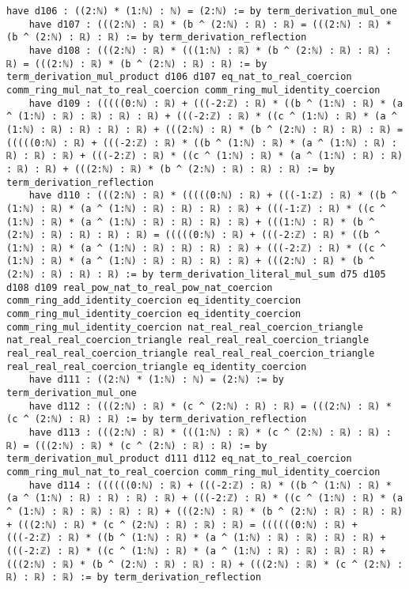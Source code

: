 \documentclass{article}
\begin{document}
\begin{tcolorbox}[colback=white!10, width=\linewidth]
\begin{lstlisting}[language=Lean4]
    have d106 : ((2:ℕ) * (1:ℕ) : ℕ) = (2:ℕ) := by term_derivation_mul_one
    have d107 : (((2:ℕ) : ℝ) * (b ^ (2:ℕ) : ℝ) : ℝ) = (((2:ℕ) : ℝ) * (b ^ (2:ℕ) : ℝ) : ℝ) := by term_derivation_reflection
    have d108 : (((2:ℕ) : ℝ) * (((1:ℕ) : ℝ) * (b ^ (2:ℕ) : ℝ) : ℝ) : ℝ) = (((2:ℕ) : ℝ) * (b ^ (2:ℕ) : ℝ) : ℝ) := by term_derivation_mul_product d106 d107 eq_nat_to_real_coercion comm_ring_mul_nat_to_real_coercion comm_ring_mul_identity_coercion
    have d109 : (((((0:ℕ) : ℝ) + (((-2:ℤ) : ℝ) * ((b ^ (1:ℕ) : ℝ) * (a ^ (1:ℕ) : ℝ) : ℝ) : ℝ) : ℝ) + (((-2:ℤ) : ℝ) * ((c ^ (1:ℕ) : ℝ) * (a ^ (1:ℕ) : ℝ) : ℝ) : ℝ) : ℝ) + (((2:ℕ) : ℝ) * (b ^ (2:ℕ) : ℝ) : ℝ) : ℝ) = (((((0:ℕ) : ℝ) + (((-2:ℤ) : ℝ) * ((b ^ (1:ℕ) : ℝ) * (a ^ (1:ℕ) : ℝ) : ℝ) : ℝ) : ℝ) + (((-2:ℤ) : ℝ) * ((c ^ (1:ℕ) : ℝ) * (a ^ (1:ℕ) : ℝ) : ℝ) : ℝ) : ℝ) + (((2:ℕ) : ℝ) * (b ^ (2:ℕ) : ℝ) : ℝ) : ℝ) := by term_derivation_reflection
    have d110 : (((2:ℕ) : ℝ) * (((((0:ℕ) : ℝ) + (((-1:ℤ) : ℝ) * ((b ^ (1:ℕ) : ℝ) * (a ^ (1:ℕ) : ℝ) : ℝ) : ℝ) : ℝ) + (((-1:ℤ) : ℝ) * ((c ^ (1:ℕ) : ℝ) * (a ^ (1:ℕ) : ℝ) : ℝ) : ℝ) : ℝ) + (((1:ℕ) : ℝ) * (b ^ (2:ℕ) : ℝ) : ℝ) : ℝ) : ℝ) = (((((0:ℕ) : ℝ) + (((-2:ℤ) : ℝ) * ((b ^ (1:ℕ) : ℝ) * (a ^ (1:ℕ) : ℝ) : ℝ) : ℝ) : ℝ) + (((-2:ℤ) : ℝ) * ((c ^ (1:ℕ) : ℝ) * (a ^ (1:ℕ) : ℝ) : ℝ) : ℝ) : ℝ) + (((2:ℕ) : ℝ) * (b ^ (2:ℕ) : ℝ) : ℝ) : ℝ) := by term_derivation_literal_mul_sum d75 d105 d108 d109 real_pow_nat_to_real_pow_nat_coercion comm_ring_add_identity_coercion eq_identity_coercion comm_ring_mul_identity_coercion eq_identity_coercion comm_ring_mul_identity_coercion nat_real_real_coercion_triangle nat_real_real_coercion_triangle real_real_real_coercion_triangle real_real_real_coercion_triangle real_real_real_coercion_triangle real_real_real_coercion_triangle eq_identity_coercion
    have d111 : ((2:ℕ) * (1:ℕ) : ℕ) = (2:ℕ) := by term_derivation_mul_one
    have d112 : (((2:ℕ) : ℝ) * (c ^ (2:ℕ) : ℝ) : ℝ) = (((2:ℕ) : ℝ) * (c ^ (2:ℕ) : ℝ) : ℝ) := by term_derivation_reflection
    have d113 : (((2:ℕ) : ℝ) * (((1:ℕ) : ℝ) * (c ^ (2:ℕ) : ℝ) : ℝ) : ℝ) = (((2:ℕ) : ℝ) * (c ^ (2:ℕ) : ℝ) : ℝ) := by term_derivation_mul_product d111 d112 eq_nat_to_real_coercion comm_ring_mul_nat_to_real_coercion comm_ring_mul_identity_coercion
    have d114 : ((((((0:ℕ) : ℝ) + (((-2:ℤ) : ℝ) * ((b ^ (1:ℕ) : ℝ) * (a ^ (1:ℕ) : ℝ) : ℝ) : ℝ) : ℝ) + (((-2:ℤ) : ℝ) * ((c ^ (1:ℕ) : ℝ) * (a ^ (1:ℕ) : ℝ) : ℝ) : ℝ) : ℝ) + (((2:ℕ) : ℝ) * (b ^ (2:ℕ) : ℝ) : ℝ) : ℝ) + (((2:ℕ) : ℝ) * (c ^ (2:ℕ) : ℝ) : ℝ) : ℝ) = ((((((0:ℕ) : ℝ) + (((-2:ℤ) : ℝ) * ((b ^ (1:ℕ) : ℝ) * (a ^ (1:ℕ) : ℝ) : ℝ) : ℝ) : ℝ) + (((-2:ℤ) : ℝ) * ((c ^ (1:ℕ) : ℝ) * (a ^ (1:ℕ) : ℝ) : ℝ) : ℝ) : ℝ) + (((2:ℕ) : ℝ) * (b ^ (2:ℕ) : ℝ) : ℝ) : ℝ) + (((2:ℕ) : ℝ) * (c ^ (2:ℕ) : ℝ) : ℝ) : ℝ) := by term_derivation_reflection

\end{lstlisting}
\end{tcolorbox}
\end{document}
